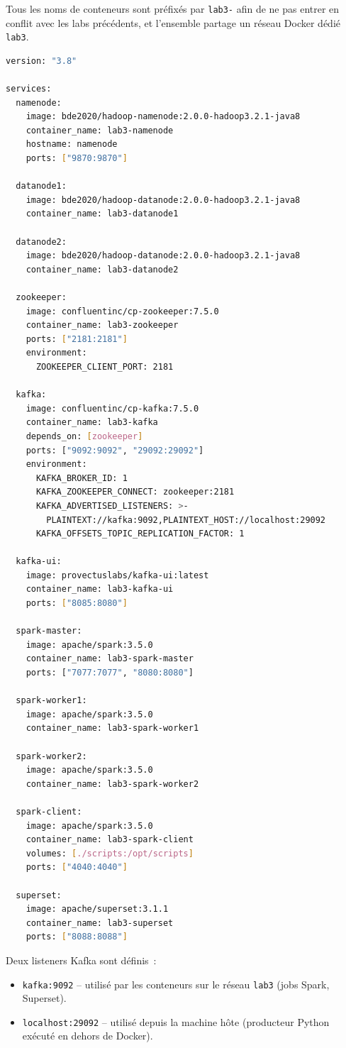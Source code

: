 \documentclass{RapportINPTCLOUD}
\begin{document}
Tous les noms de conteneurs sont pr\'{e}fix\'{e}s par \texttt{lab3-} afin de ne pas entrer en conflit avec les labs pr\'{e}c\'{e}dents, et l'ensemble partage un r\'{e}seau Docker d\'{e}di\'{e} \texttt{lab3}.

\begin{lstlisting}[style=code, language=bash, caption=docker-compose.yml (extrait)]
version: "3.8"

services:
  namenode:
    image: bde2020/hadoop-namenode:2.0.0-hadoop3.2.1-java8
    container_name: lab3-namenode
    hostname: namenode
    ports: ["9870:9870"]

  datanode1:
    image: bde2020/hadoop-datanode:2.0.0-hadoop3.2.1-java8
    container_name: lab3-datanode1

  datanode2:
    image: bde2020/hadoop-datanode:2.0.0-hadoop3.2.1-java8
    container_name: lab3-datanode2

  zookeeper:
    image: confluentinc/cp-zookeeper:7.5.0
    container_name: lab3-zookeeper
    ports: ["2181:2181"]
    environment:
      ZOOKEEPER_CLIENT_PORT: 2181

  kafka:
    image: confluentinc/cp-kafka:7.5.0
    container_name: lab3-kafka
    depends_on: [zookeeper]
    ports: ["9092:9092", "29092:29092"]
    environment:
      KAFKA_BROKER_ID: 1
      KAFKA_ZOOKEEPER_CONNECT: zookeeper:2181
      KAFKA_ADVERTISED_LISTENERS: >-
        PLAINTEXT://kafka:9092,PLAINTEXT_HOST://localhost:29092
      KAFKA_OFFSETS_TOPIC_REPLICATION_FACTOR: 1

  kafka-ui:
    image: provectuslabs/kafka-ui:latest
    container_name: lab3-kafka-ui
    ports: ["8085:8080"]

  spark-master:
    image: apache/spark:3.5.0
    container_name: lab3-spark-master
    ports: ["7077:7077", "8080:8080"]

  spark-worker1:
    image: apache/spark:3.5.0
    container_name: lab3-spark-worker1

  spark-worker2:
    image: apache/spark:3.5.0
    container_name: lab3-spark-worker2

  spark-client:
    image: apache/spark:3.5.0
    container_name: lab3-spark-client
    volumes: [./scripts:/opt/scripts]
    ports: ["4040:4040"]

  superset:
    image: apache/superset:3.1.1
    container_name: lab3-superset
    ports: ["8088:8088"]
\end{lstlisting}

Deux listeners Kafka sont d\'{e}finis~:
\begin{itemize}[leftmargin=2em]
    \item \texttt{kafka:9092} -- utilis\'{e} par les conteneurs sur le r\'{e}seau \texttt{lab3} (jobs Spark, Superset).
    \item \texttt{localhost:29092} -- utilis\'{e} depuis la machine h\^{o}te (producteur Python ex\'{e}cut\'{e} en dehors de Docker).
\end{itemize}
\end{document}
